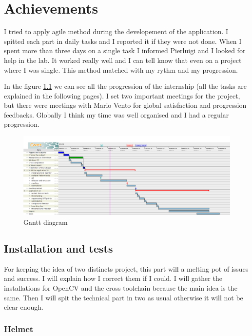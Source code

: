 \chapter{Achievements}
\par I tried to apply agile method during the developement of the application. I spitted each part in daily tasks and I reported it if they were not done. When I spent more than three days on a single task I informed Pierluigi and I looked for help in the lab. It worked really well and I can tell know that even on a project where I was single. This method matched with my rythm and my progression.
\par In the figure \ref{gantt} we can see all the progression of the internship (all the tasks are explained in the following pages). I set two important meetings for the project, but there were meetings with Mario Vento for global satisfaction and progression feedbacks. Globally I think my time was well organised and I had a regular progression.
	\begin{figure}[h]
		\begin{center}
			\includegraphics[width=15cm]{images_not_compressed/gantt.png}
			\caption{Gantt diagram}
			\label{gantt}	
		\end{center}
	\end{figure}
	\section{Installation and tests}
	

\par For keeping the idea of two distincts project, this part will a melting pot of issues and success. I will explain how I correct them if I could. I will gather the installations for OpenCV and the cross toolchain because the main idea is the same. Then I will spit the technical part in two as usual otherwise it will not be clear enough.


	\subsection{Helmet}
